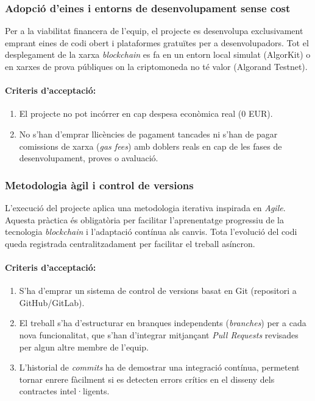 \subsubsection{Adopció d'eines i entorns de desenvolupament sense cost}

Per a la viabilitat financera de l'equip, el projecte es desenvolupa exclusivament emprant eines de codi obert i plataformes gratuïtes per a desenvolupadors. 
Tot el desplegament de la xarxa \textit{blockchain} es fa en un entorn local simulat (AlgorKit) o en xarxes de prova públiques on la criptomoneda no té valor (Algorand Testnet).

\paragraph{Criteris d'acceptació:}
\begin{enumerate}[label=\roman*.]
    \item El projecte no pot incórrer en cap despesa econòmica real (0 EUR).
    \item No s'han d'emprar llicències de pagament tancades ni s'han de pagar comissions de xarxa (\textit{gas fees}) amb doblers reals en cap de les fases de desenvolupament, proves o avaluació.
\end{enumerate}

\subsubsection{Metodologia àgil i control de versions}

L'execució del projecte aplica una metodologia iterativa inspirada en \textit{Agile}. 
Aquesta pràctica és obligatòria per facilitar l'aprenentatge progressiu de la tecnologia \textit{blockchain} i l'adaptació contínua als canvis. 
Tota l'evolució del codi queda registrada centralitzadament per facilitar el treball asíncron.

\paragraph{Criteris d'acceptació:}
\begin{enumerate}[label=\roman*.]
    \item S'ha d'emprar un sistema de control de versions basat en Git (repositori a GitHub/GitLab).
    \item El treball s'ha d'estructurar en branques independents (\textit{branches}) per a cada nova funcionalitat, que s'han d'integrar mitjançant \textit{Pull Requests} revisades per algun altre membre de l'equip.
    \item L'historial de \textit{commits} ha de demostrar una integració contínua, permetent tornar enrere fàcilment si es detecten errors crítics en el disseny dels contractes intel·ligents.
\end{enumerate}

